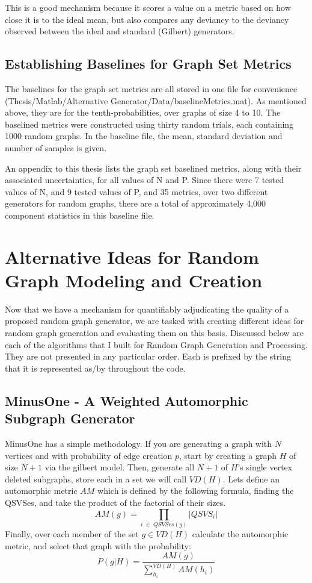 This is a good mechanism because it scores a value on a metric based on how close it is to the ideal mean, but also compares any deviancy to the deviancy observed between the ideal and standard (Gilbert) generators.

\subsection{Establishing Baselines for Graph Set Metrics}

The baselines for the graph set metrics are all stored in one file for convenience (Thesis/Matlab/Alternative Generator/Data/baselineMetrics.mat).
As mentioned above, they are for the tenth-probabilities, over graphs of size 4 to 10.
The baselined metrics were constructed using thirty random trials, each containing 1000 random graphs.
In the baseline file, the mean, standard deviation and number of samples is given.

An appendix to this thesis lists the graph set baselined metrics, along with their associated uncertainties, for all values of N and P.
Since there were 7 tested values of N, and 9 tested values of P, and 35 metrics, over two different generators for random graphs, there are a total of approximately 4,000 component statistics in this baseline file.

\section{Alternative Ideas for Random Graph Modeling and Creation}

Now that we have a mechanism for quantifiably adjudicating the quality of a proposed random graph generator, we are tasked with creating different ideas for random graph generation and evaluating them on this basis.
Discussed below are each of the algorithms that I built for Random Graph Generation and Processing.
They are not presented in any particular order.
Each is prefixed by the string that it is represented as/by throughout the code.

\subsection{MinusOne - A Weighted Automorphic Subgraph Generator}

MinusOne has a simple methodology.
If you are generating a graph with $N$ vertices and with probability of edge creation $p$, start by creating a graph $H$ of size $N+1$ via the gilbert model.
Then, generate all $N+1$ of $H$'s single vertex deleted subgraphs, store each in a set we will call $VD(H)$.
Lets define an automorphic metric $AM$ which is defined by the following formula, finding the QSVSes, and take the product of the factorial of their sizes.
$$AM(g) = \prod_{i \;\in \;QSVSes(g)} |QSVS_i|$$
Finally, over each member of the set $g \in VD(H)$ calculate the automorphic metric, and select that graph with the probability:
$$P(g | H) = \frac{AM(g)}{\sum_{h_i}^{VD(H)} AM(h_i)}$$

